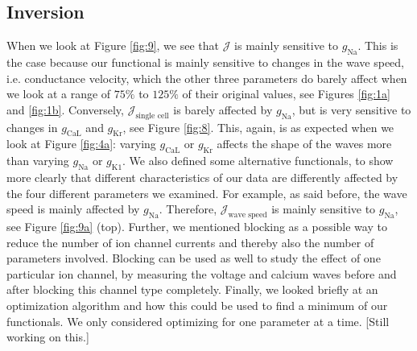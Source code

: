 \documentclass{article}
\begin{document}
\subsection{Inversion} \label{Inversion 2}
%
When we look at Figure \ref{fig:9}, we see that $\mathcal{J}$ is mainly sensitive to $g_{\mathrm{Na}}$. This is the case because our functional is mainly sensitive to changes in the wave speed, i.e. conductance velocity, which the other three parameters do barely affect when we look at a range of $75\%$ to $125 \%$ of their original values, see Figures \ref{fig:1a} and \ref{fig:1b}. Conversely, $\mathcal{J}_{\text{single cell}}$ is barely affected by $g_{\mathrm{Na}}$, but is very sensitive to changes in $g_{\mathrm{CaL}}$ and $g_{\mathrm{Kr}}$, see Figure \ref{fig:8}. This, again, is as expected when we look at Figure \ref{fig:4a}: varying $g_{\mathrm{CaL}}$ or $g_{\mathrm{Kr}}$ affects the shape of the waves more than varying $g_{\mathrm{Na}}$ or $g_{\mathrm{K1}}$. We also defined some alternative functionals, to show more clearly that different characteristics of our data are differently affected by the four different parameters we examined. For example, as said before, the wave speed is mainly affected by $g_{\mathrm{Na}}$. Therefore, $\mathcal{J}_{\text{wave speed}}$ is mainly sensitive to $g_{\mathrm{Na}}$, see Figure \ref{fig:9a} (top). Further, we mentioned blocking as a possible way to reduce the number of ion channel currents and thereby also the number of parameters involved. Blocking can be used as well to study the effect of one particular ion channel, by measuring the voltage and calcium waves before and after blocking this channel type completely.
Finally, we looked briefly at an optimization algorithm and how this could be used to find a minimum of our functionals. We only considered optimizing for one parameter at a time. [Still working on this.]
\end{document}
